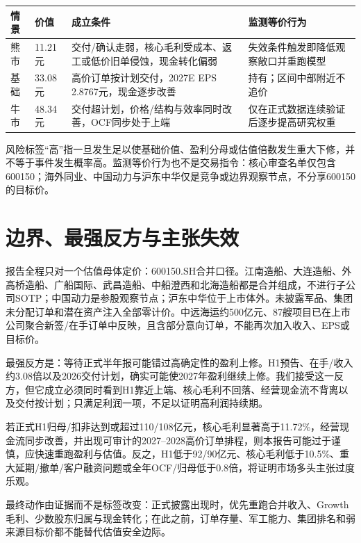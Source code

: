 \begin{exhibitbox}[情景、条件与监测等价行为]
\small
\begin{tabularx}{\exhibitboxwidth}{L{2.0cm}R{2.0cm}L{4.8cm}X}
\toprule
\textbf{情景} & \textbf{价值} & \textbf{成立条件} & \textbf{监测等价行为} \\
\midrule
熊市 & 11.21元 & 交付/确认走弱，核心毛利受成本、返工或低价旧单侵蚀，现金转化偏弱 & 失效条件触发即降低观察敞口并重跑模型 \\
基础 & 33.08元 & 高价订单按计划交付，2027E EPS 2.8767元，现金逐步改善 & 持有；区间中部附近不追价 \\
牛市 & 48.34元 & 交付超计划，价格/结构与效率同时改善，OCF同步处于上端 & 仅在正式数据连续验证后逐步提高研究权重 \\
\bottomrule
\end{tabularx}
\end{exhibitbox}

风险标签“高”指一旦发生足以使基础价值、盈利分母或估值倍数发生重大下修，并不等于事件发生概率高。监测等价行为也不是交易指令：核心审查名单仅包含600150；海外同业、中国动力与沪东中华仅是竞争或边界观察节点，不分享600150的目标价。

\section{边界、最强反方与主张失效}

报告全程只对一个估值母体定价：600150.SH合并口径。江南造船、大连造船、外高桥造船、广船国际、武昌造船、中船澄西和北海造船都是合并组成，不进行子公司SOTP；中国动力是参股观察节点；沪东中华位于上市体外。未披露军品、集团未分配订单和潜在资产注入全部零计价。中远海运约500亿元、87艘项目已在上市公司聚合新签/在手订单中反映，且含部分意向订单，不能再次加入收入、EPS或目标价。

最强反方是：等待正式半年报可能错过高确定性的盈利上修。H1预告、在手/收入约3.08倍以及2026交付计划，确实可能使2027年盈利继续上修。我们接受这一反方，但它成立必须同时看到H1靠近上端、核心毛利不回落、经营现金流不背离以及交付按计划；只满足利润一项，不足以证明高利润持续期。

\begin{riskbox}[什么会证明本报告错了]
若正式H1归母/扣非达到或超过110/108亿元，核心毛利显著高于11.72\%，经营现金流同步改善，并出现可审计的2027--2028高价订单排程，则本报告可能过于谨慎，应快速重跑盈利与估值。反之，H1低于92/90亿元、核心毛利低于10.5\%、重大延期/撤单/客户融资问题或全年OCF/归母低于0.8倍，将证明市场多头主张过度乐观。
\end{riskbox}

最终动作由证据而不是标签改变：正式披露出现时，优先重跑合并收入、Growth毛利、少数股东归属与现金转化；在此之前，订单存量、军工能力、集团排名和弱来源目标价都不能替代估值安全边际。
